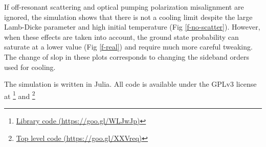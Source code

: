 \documentclass[aps,twocolumn,secnumarabic,amsmath,amssymb]{revtex4}
\begin{document}
If off-resonant scattering and optical pumping polarization misalignment are ignored,
the simulation shows that there is not a cooling limit
despite the large Lamb-Dicke parameter and high initial temperature (Fig \ref{f-no-scatter}).
However, when these effects are taken into account, the ground state probability can saturate at
a lower value (Fig \ref{f-real}) and require much more careful tweaking.
The change of slop in these plots corresponds to changing the sideband orders used for cooling.

The simulation is written in Julia\cite{Bezanson2017}.
All code is available under the GPLv3 license at
\footnote{\href{https://goo.gl/WLJwJp}{Library code (https://goo.gl/WLJwJp)}} and
\footnote{\href{https://goo.gl/XXVreq}{Top level code (https://goo.gl/XXVreq)}}



\end{document}
